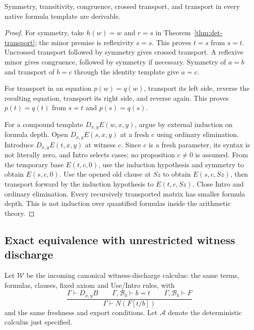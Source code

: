 \begin{corollary}
\label{cor:det-equality}
Symmetry, transitivity, congruence, crossed transport, and transport in
every native formula template are derivable.
\end{corollary}
\begin{proof}
For symmetry, take $h(w)=w$ and $r=s$ in
Theorem~\ref{thm:det-transport}; the minor premise is reflexivity $s=s$.
This proves $t=s$ from $s=t$. Uncrossed transport followed by symmetry
gives crossed transport. A reflexive minor gives congruence, followed by
symmetry if necessary. Symmetry of $a=b$ and transport of $b=c$ through
the identity template give $a=c$.

For transport in an equation $p(w)=q(w)$, transport its left side,
reverse the resulting equation, transport its right side, and reverse
again. This proves $p(t)=q(t)$ from $s=t$ and $p(s)=q(s)$.

For a compound template $D_{x,y}E(w,x,y)$, argue by external induction
on formula depth. Open $D_{x,y}E(s,x,y)$ at a fresh $c$ using ordinary
elimination. Introduce $D_{x,y}E(t,x,y)$ at witness $c$. Since $c$ is
a fresh parameter, its syntax is not literally zero, and Intro selects
cases; no proposition $c\ne0$ is assumed. From the temporary base
$E(t,c,0)$, use the induction hypothesis and symmetry to obtain
$E(s,c,0)$. Use the opened old clause at $Sz$ to obtain $E(s,c,Sz)$,
then transport forward by the induction hypothesis to $E(t,c,Sz)$.
Close Intro and ordinary elimination. Every recursively transported
matrix has smaller formula depth. This is not induction over quantified
formulas inside the arithmetic theory.
\end{proof}

\subsection{Exact equivalence with unrestricted witness discharge}

Let $\mathcal W$ be the incoming canonical witness-discharge calculus:
the same terms, formulas, clauses, fixed axiom and Use/Intro rules, with
\[
 \frac{\Gamma\vdash D_{x,y}B\qquad
       \Gamma,\mathcal B_b\vdash b=t\qquad
       \Gamma,\mathcal B_b\vdash F}
      {\Gamma\vdash N(F[t/b])}
 \tag{Old Name}
\]
and the same freshness and export conditions. Let $\mathcal A$ denote
the deterministic calculus just specified.

